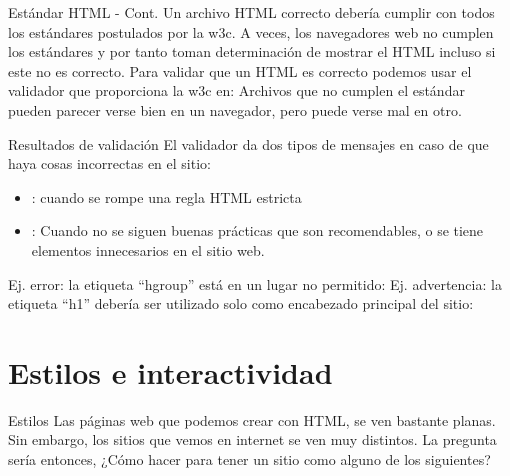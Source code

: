 
\begin{frame}[fragile]{Estándar HTML - Cont.}
	Un archivo HTML correcto debería cumplir con todos los estándares postulados
	por la w3c.
	\jump
	A veces, los navegadores web no cumplen los estándares y por tanto toman
	determinación de mostrar el HTML incluso si este no es correcto.
	\jump
	Para validar que un HTML es correcto podemos usar el validador que proporciona
	la w3c en: 
	\jump
	Archivos que no cumplen el estándar pueden parecer verse bien en un navegador,
	pero puede verse mal en otro.
\end{frame}


\begin{frame}[fragile]{Resultados de validación}
	El validador da dos tipos de mensajes en caso de que haya cosas incorrectas en
	el sitio:
	\begin{itemize}
		\item {}: cuando se rompe una regla HTML estricta
		\item {}: Cuando no se siguen buenas prácticas que son
			recomendables, o se tiene elementos innecesarios en el sitio web.
	\end{itemize}
	Ej. error: la etiqueta ``hgroup'' está en un lugar no permitido:
	Ej. advertencia: la etiqueta “h1” debería ser utilizado solo como
	encabezado principal del sitio:
\end{frame}


\section{Estilos e interactividad}


\begin{frame}[fragile]{Estilos}
	Las páginas web que podemos crear con HTML, se ven bastante planas.
	Sin embargo, los sitios que vemos en internet se ven muy distintos.
	\jump
	La pregunta sería entonces, ¿Cómo hacer para tener un sitio como alguno de los
	siguientes?
	\jump
\end{frame}


